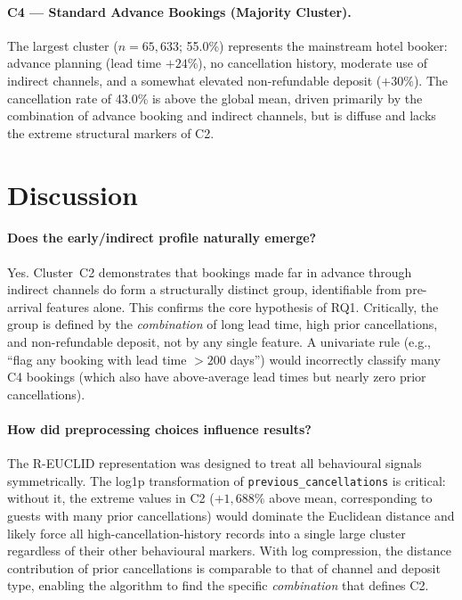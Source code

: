 \documentclass[12pt,a4paper]{article}
\begin{document}
\paragraph{C4 --- Standard Advance Bookings (Majority Cluster).}
The largest cluster ($n=65{,}633$; 55.0\%) represents the mainstream
hotel booker: advance planning (lead time $+24\%$), no cancellation history,
moderate use of indirect channels, and a somewhat elevated non-refundable
deposit ($+30\%$).
The cancellation rate of 43.0\% is above the global mean, driven primarily
by the combination of advance booking and indirect channels, but is
diffuse and lacks the extreme structural markers of C2.

\section{Discussion}
\label{sec:discussion}

\paragraph{Does the early/indirect profile naturally emerge?}
Yes. Cluster~C2 demonstrates that bookings made far in advance through
indirect channels do form a structurally distinct group, identifiable from
pre-arrival features alone. This confirms the core hypothesis of RQ1.
Critically, the group is defined by the \emph{combination} of long lead time,
high prior cancellations, and non-refundable deposit, not by any single
feature. A univariate rule (e.g., ``flag any booking with lead time $> 200$
days'') would incorrectly classify many C4 bookings (which also have above-average
lead times but nearly zero prior cancellations).

\paragraph{How did preprocessing choices influence results?}
The R-EUCLID representation was designed to treat all behavioural signals
symmetrically. The log1p transformation of \texttt{previous\_cancellations}
is critical: without it, the extreme values in C2 ($+1{,}688\%$ above mean,
corresponding to guests with many prior cancellations) would dominate the
Euclidean distance and likely force all high-cancellation-history records
into a single large cluster regardless of their other behavioural markers.
With log compression, the distance contribution of prior cancellations is
comparable to that of channel and deposit type, enabling the algorithm to
find the specific \emph{combination} that defines C2.
\end{document}
